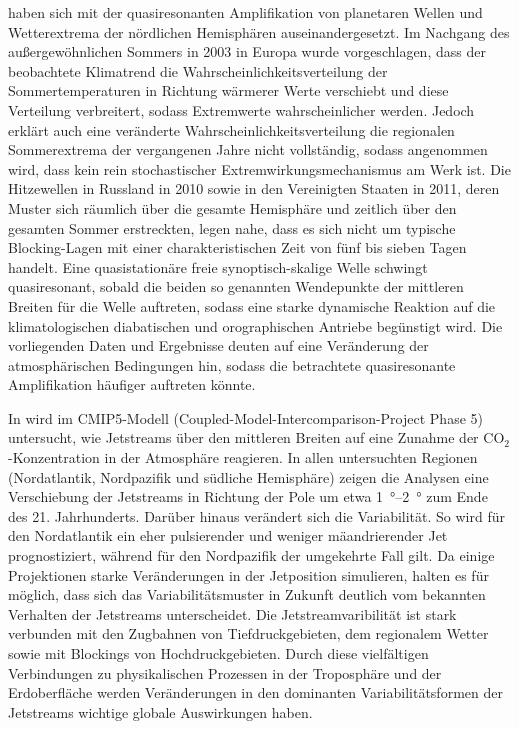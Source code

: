 \citet{petoukhov-2013} haben sich mit der quasiresonanten Amplifikation von planetaren Wellen und Wetterextrema der nördlichen Hemisphären auseinandergesetzt. Im Nachgang des außergewöhnlichen Sommers in 2003 in Europa wurde vorgeschlagen, dass der beobachtete Klimatrend die Wahrscheinlichkeitsverteilung der Sommertemperaturen in Richtung wärmerer Werte verschiebt und diese Verteilung verbreitert, sodass Extremwerte wahrscheinlicher werden. Jedoch erklärt auch eine veränderte Wahrscheinlichkeitsverteilung die regionalen Sommerextrema der vergangenen Jahre nicht vollständig, sodass angenommen wird, dass kein rein stochastischer Extremwirkungsmechanismus am Werk ist. Die Hitzewellen in Russland in 2010 sowie in den Vereinigten Staaten in 2011, deren Muster sich räumlich über die gesamte Hemisphäre und zeitlich über den gesamten Sommer erstreckten, legen nahe, dass es sich nicht um typische Blocking-Lagen mit einer charakteristischen Zeit von fünf bis sieben Tagen handelt. Eine quasistationäre freie synoptisch-skalige Welle schwingt quasiresonant, sobald die beiden so genannten Wendepunkte der mittleren Breiten für die Welle auftreten, sodass eine starke dynamische Reaktion auf die klimatologischen diabatischen und orographischen Antriebe begünstigt wird. Die vorliegenden Daten und Ergebnisse deuten auf eine Veränderung der atmosphärischen Bedingungen hin, sodass die betrachtete quasiresonante Amplifikation häufiger auftreten könnte.

In \citet{barnes-2013-b} wird im CMIP5-Modell (Coupled-Model-Inter\-com\-parison-Project Phase 5) untersucht, wie Jetstreams über den mittleren Breiten auf eine Zunahme der CO$_2$-Konzentration in der Atmosphäre reagieren. In allen untersuchten Regionen (Nordatlantik, Nordpazifik und südliche Hemisphäre) zeigen die Analysen eine Verschiebung der Jetstreams in Richtung der Pole um etwa \SIrange{1}{2}{\degree} zum Ende des 21. Jahrhunderts. Darüber hinaus verändert sich die Variabilität. So wird für den Nordatlantik ein eher pulsierender und weniger mäandrierender Jet prognostiziert, während für den Nordpazifik der umgekehrte Fall gilt. Da einige Projektionen starke Veränderungen in der Jetposition simulieren, halten \citet{barnes-2013-b} es für möglich, dass sich das Variabilitätsmuster in Zukunft deutlich vom bekannten Verhalten der Jetstreams unterscheidet. Die Jetstreamvaribilität ist stark verbunden mit den Zugbahnen von Tiefdruckgebieten, dem regionalem Wetter sowie mit Blockings von Hochdruckgebieten. Durch diese vielfältigen Verbindungen zu physikalischen Prozessen in der Troposphäre und der Erdoberfläche werden Veränderungen in den dominanten Variabilitätsformen der Jetstreams wichtige globale Auswirkungen haben.

